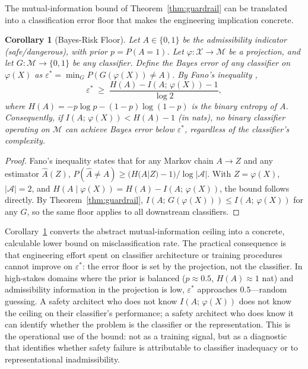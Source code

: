 \documentclass[11pt, a4paper]{article}
\theoremstyle{plain}
\newtheorem{corollary}{Corollary}
\theoremstyle{definition}
\theoremstyle{remark}
\begin{document}
The mutual-information bound of Theorem~\ref{thm:guardrail} can be translated
into a classification error floor that makes the engineering implication concrete.

\begin{corollary}[Bayes-Risk Floor]
\label{cor:bayes}
Let $A \in \{0,1\}$ be the admissibility indicator (safe/dangerous), with
prior $p = P(A=1)$. Let $\varphi : \mathcal{X} \to \mathcal{M}$ be a
projection, and let $G : \mathcal{M} \to \{0,1\}$ be any classifier. Define
the Bayes error of any classifier on $\varphi(X)$ as
$\varepsilon^* = \min_G P(G(\varphi(X)) \neq A)$.
By Fano's inequality \citep{cover2006elements},
\begin{equation}
  \varepsilon^* \;\geq\; \frac{H(A) - I(A;\,\varphi(X)) - 1}{\log 2},
\end{equation}
where $H(A) = -p\log p - (1-p)\log(1-p)$ is the binary entropy of $A$.
Consequently, if $I(A;\,\varphi(X)) < H(A) - 1$ (in nats), no binary
classifier operating on $\mathcal{M}$ can achieve Bayes error below
$\varepsilon^*$, regardless of the classifier's complexity.
\end{corollary}

\begin{proof}
Fano's inequality states that for any Markov chain $A \to Z$ and any estimator
$\hat{A}(Z)$, $P(\hat{A} \neq A) \geq (H(A|Z) - 1)/\log|\mathcal{A}|$. With
$Z = \varphi(X)$, $|\mathcal{A}| = 2$, and $H(A \mid \varphi(X)) = H(A) -
I(A;\,\varphi(X))$, the bound follows directly. By
Theorem~\ref{thm:guardrail}, $I(A;\,G(\varphi(X))) \leq I(A;\,\varphi(X))$
for any $G$, so the same floor applies to all downstream classifiers.
\end{proof}

Corollary~\ref{cor:bayes} converts the abstract mutual-information ceiling into
a concrete, calculable lower bound on misclassification rate. The practical
consequence is that engineering effort spent on classifier architecture or
training procedures cannot improve on $\varepsilon^*$: the error floor is set by
the projection, not the classifier. In high-stakes domains where the prior is
balanced ($p \approx 0.5$, $H(A) \approx 1$ nat) and admissibility information in
the projection is low, $\varepsilon^*$ approaches $0.5$---random guessing. A
safety architect who does not know $I(A;\,\varphi(X))$ does not know the ceiling
on their classifier's performance; a safety architect who does know it can identify
whether the problem is the classifier or the representation. This is the
operational use of the bound: not as a training signal, but as a diagnostic that
identifies whether safety failure is attributable to classifier inadequacy or
to representational inadmissibility.
\end{document}

